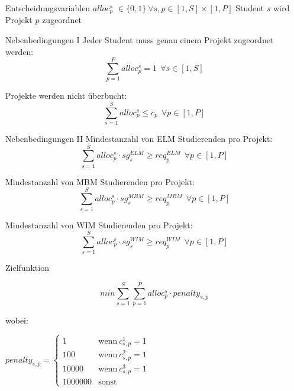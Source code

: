 \documentclass[11pt]{beamer}
\begin{document}
\begin{frame}{Entscheidungsvariablen}
$alloc^{s}_p$ $\in \{0, 1\} ~ \forall s,p \in \left[1, S\right] \times \left[1, P\right]$ 
\newline
\newline
Student $s$ wird Projekt $p$ zugeordnet

\end{frame}

\begin{frame}{Nebenbedingungen I}
Jeder Student muss genau einem Projekt zugeordnet werden:
\[ \sum_{p=1}^P alloc^{s}_p = 1 ~~\forall s \in \left[1, S\right]\]

Projekte werden nicht überbucht:
\[ \sum_{s=1}^S alloc^{s}_p \leq c_p ~~\forall p \in \left[1, P\right]\]
\end{frame}

\begin{frame}{Nebenbedingungen II}
Mindestanzahl von ELM Studierenden pro Projekt:
\[ \sum_{s=1}^S alloc^{s}_p \cdot sg^{ELM}_s \geq req^{ELM}_p ~~\forall p \in \left[1, P\right]\]

Mindestanzahl von MBM Studierenden pro Projekt:
\[ \sum_{s=1}^S alloc^{s}_p \cdot sg^{MBM}_s \geq req^{MBM}_p ~~\forall p \in \left[1, P\right]\]

Mindestanzahl von WIM Studierenden pro Projekt:
\[ \sum_{s=1}^S alloc^{s}_p \cdot sg^{WIM}_s \geq req^{WIM}_p ~~\forall p \in \left[1, P\right]\]
\end{frame}

\begin{frame}{Zielfunktion}

\[ 
min \sum_{s=1}^S \sum_{p=1}^P alloc^{s}_p \cdot penalty_{s,p} \]

wobei:

$penalty_{s,p} = 
\begin{cases}
1 		& \text{wenn}~ c^1_{s,p} = 1 \\
100 		& \text{wenn}~ c^2_{s,p} = 1 \\
10000 	& \text{wenn}~ c^3_{s,p} = 1 \\
1000000 	& \text{sonst}
\end{cases}$

\end{frame}
\end{document}
